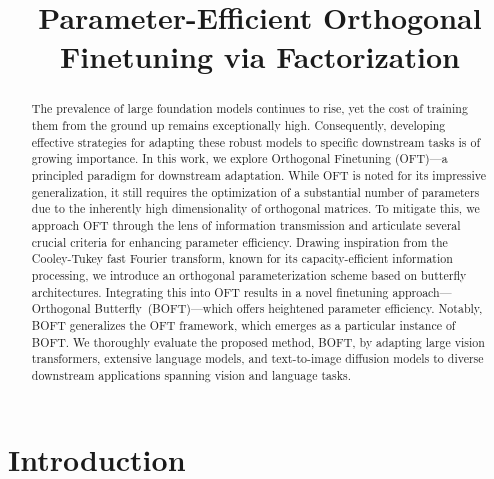 \title{Parameter-Efficient Orthogonal Finetuning via Factorization}

\begin{abstract}
The prevalence of large foundation models continues to rise, yet the cost of training them from the ground up remains exceptionally high. Consequently, developing effective strategies for adapting these robust models to specific downstream tasks is of growing importance. In this work, we explore Orthogonal Finetuning (OFT)—a principled paradigm for downstream adaptation. While OFT is noted for its impressive generalization, it still requires the optimization of a substantial number of parameters due to the inherently high dimensionality of orthogonal matrices. To mitigate this, we approach OFT through the lens of information transmission and articulate several crucial criteria for enhancing parameter efficiency. Drawing inspiration from the Cooley-Tukey fast Fourier transform, known for its capacity-efficient information processing, we introduce an orthogonal parameterization scheme based on butterfly architectures. Integrating this into OFT results in a novel finetuning approach—Orthogonal Butterfly~(BOFT)—which offers heightened parameter efficiency. Notably, BOFT generalizes the OFT framework, which emerges as a particular instance of BOFT. We thoroughly evaluate the proposed method, BOFT, by adapting large vision transformers, extensive language models, and text-to-image diffusion models to diverse downstream applications spanning vision and language tasks.
\end{abstract}

\section{Introduction}

